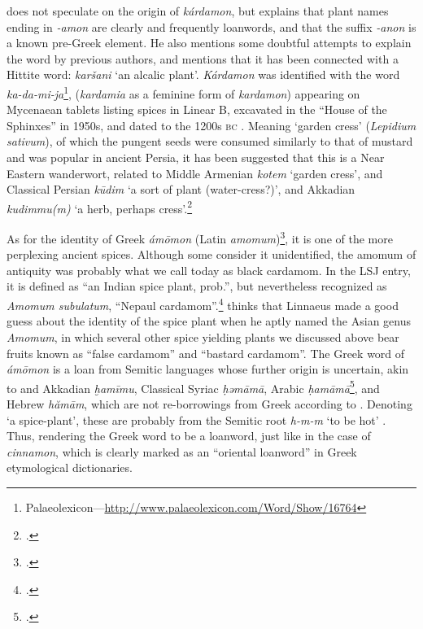 \textcite[644]{beekes_etymological_2010} does not speculate on the origin of \textit{kárdamon}, but explains that plant names ending in \textit{-amon} are clearly and frequently loanwords, and that the suffix \textit{-anon} is a known pre-Greek element. He also mentions some doubtful attempts to explain the word by previous authors, and mentions that it has been connected with a Hittite word: \textit{karšani} `an alcalic plant'. \textit{Kárdamon} was identified with the word \lb{\KADAMIJA} \textit{ka-da-mi-ja}\footnote{Palaeolexicon---\url{http://www.palaeolexicon.com/Word/Show/16764}}, (\textit{kardamia} as a feminine form of \textit{kardamon}) appearing on Mycenaean tablets listing spices in Linear B, excavated in the ``House of the Sphinxes'' in 1950s, and dated to the 1200s \textsc{bc} \autocite[107]{bennett_mycenae_1958}. Meaning `garden cress' (\textit{Lepidium sativum}), of which the pungent seeds were consumed similarly to that of mustard and was popular in ancient Persia, it has been suggested that this is a Near Eastern \gls{wanderwort}, related to Middle Armenian  \textit{kotem} `garden cress', and Classical Persian  \textit{kūdim} `a sort of plant (water-cress?)', and Akkadian \textit{kudimmu(m)} `a herb, perhaps cress'.\footcites[cf.][p. 371 ]{kouyoumdjian_comprehensive_1970}[]{asatrian_marginal_2012}[L14]{black_concise_2000}



As for the identity of Greek \textit{ámōmon} (Latin \textit{amomum})\footcite[amomum]{lewis_latin_1879}, it is one of the more perplexing ancient spices. Although some consider it unidentified, the amomum of antiquity was probably what we call today as black cardamom. In the \gls{LSJ} entry, it is defined as ``an Indian spice plant, prob.'', but nevertheless recognized as \textit{Amomum subulatum}, ``Nepaul cardamom''.\footcite[ἄμωμον]{liddell_greek-english_1940} \textcite[103]{dalby_dangerous_2000} thinks that Linnaeus made a good guess about the identity of the spice plant when he aptly named the Asian genus \textit{Amomum}, in which several other spice yielding plants we discussed above bear fruits known as ``false cardamom'' and ``bastard cardamom''. The Greek word of \textit{ámōmon} is a loan from Semitic languages whose further origin is uncertain, akin to and Akkadian \textit{ḫamīmu}, Classical Syriac  \textit{ḥəmāmā}, Arabic  \textit{ḥamāmā}\footcites[cf.][vol. 6, p. 66]{roth_assyrian_2004} [cardamom ]{ahd}[169]{low_aramaeische_1881}[100]{lev_practical_2008}, and Hebrew  
\textit{hămām}, which are not re-borrowings from Greek according to \textcite[123]{low_aramaeische_1881}. Denoting `a spice-plant', these are probably from the Semitic root \textit{h-m-m} `to be hot' \autocite[222]{klein_comprehensive_1987}. Thus, rendering the Greek word to be a loanword, just like in the case of \textit{cinnamon}, which is clearly marked as an ``oriental loanword'' in Greek etymological dictionaries.

